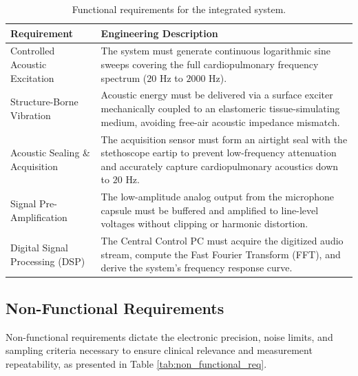 \begin{table}[H]
    \centering
    \caption{Functional requirements for the integrated system.}
    \label{tab:functional_req}
    \renewcommand{\arraystretch}{1.3}
    \begin{tabular}{|p{4.8cm}|p{9.2cm}|}
        \hline
        \textbf{Requirement} & \textbf{Engineering Description} \\
        \hline
        Controlled Acoustic Excitation & The system must generate continuous logarithmic sine sweeps covering the full cardiopulmonary frequency spectrum ($20\text{ Hz}$ to $2000\text{ Hz}$). \\
        \hline
        Structure-Borne Vibration & Acoustic energy must be delivered via a surface exciter mechanically coupled to an elastomeric tissue-simulating medium, avoiding free-air acoustic impedance mismatch. \\
        \hline
        Acoustic Sealing \& Acquisition & The acquisition sensor must form an airtight seal with the stethoscope eartip to prevent low-frequency attenuation and accurately capture cardiopulmonary acoustics down to $20\text{ Hz}$. \\
        \hline
        Signal Pre-Amplification & The low-amplitude analog output from the microphone capsule must be buffered and amplified to line-level voltages without clipping or harmonic distortion. \\
        \hline
        Digital Signal Processing (DSP) & The Central Control PC must acquire the digitized audio stream, compute the Fast Fourier Transform (FFT), and derive the system's frequency response curve. \\
        \hline
    \end{tabular}
\end{table}

\subsection{Non-Functional Requirements}

Non-functional requirements dictate the electronic precision, noise limits, and sampling criteria necessary to ensure clinical relevance and measurement repeatability, as presented in Table \ref{tab:non_functional_req}.

